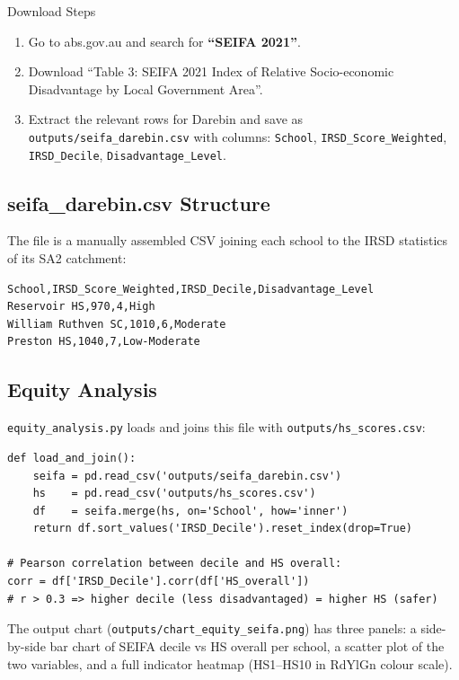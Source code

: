 \documentclass[11pt,a4paper,openany]{book}
\begin{document}
\begin{tipbox}{Download Steps}
\begin{enumerate}
  \item Go to abs.gov.au and search for \textbf{``SEIFA 2021''}.
  \item Download ``Table 3: SEIFA 2021 Index of Relative Socio-economic Disadvantage by Local Government Area''.
  \item Extract the relevant rows for Darebin and save as \texttt{outputs/seifa\_darebin.csv} with columns: \texttt{School}, \texttt{IRSD\_Score\_Weighted}, \texttt{IRSD\_Decile}, \texttt{Disadvantage\_Level}.
\end{enumerate}
\end{tipbox}

\subsection{seifa\_darebin.csv Structure}

The file is a manually assembled CSV joining each school to the IRSD statistics of its SA2 catchment:

\begin{lstlisting}[style=text]
School,IRSD_Score_Weighted,IRSD_Decile,Disadvantage_Level
Reservoir HS,970,4,High
William Ruthven SC,1010,6,Moderate
Preston HS,1040,7,Low-Moderate
\end{lstlisting}

\subsection{Equity Analysis}

\texttt{equity\_analysis.py} loads and joins this file with \texttt{outputs/hs\_scores.csv}:

\begin{lstlisting}[style=python, caption={SEIFA join and equity correlation.}]
def load_and_join():
    seifa = pd.read_csv('outputs/seifa_darebin.csv')
    hs    = pd.read_csv('outputs/hs_scores.csv')
    df    = seifa.merge(hs, on='School', how='inner')
    return df.sort_values('IRSD_Decile').reset_index(drop=True)

# Pearson correlation between decile and HS overall:
corr = df['IRSD_Decile'].corr(df['HS_overall'])
# r > 0.3 => higher decile (less disadvantaged) = higher HS (safer)
\end{lstlisting}

The output chart (\texttt{outputs/chart\_equity\_seifa.png}) has three panels: a side-by-side bar chart of SEIFA decile vs HS overall per school, a scatter plot of the two variables, and a full indicator heatmap (HS1--HS10 in RdYlGn colour scale).
\end{document}
